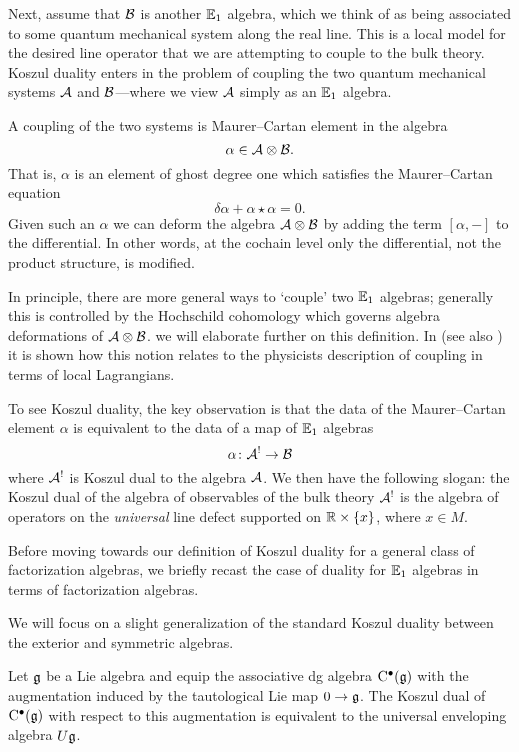 \documentclass[11pt]{amsart}
\begin{document}
Next, assume that $\mathcal B$ is another $\mathbb E_1$ algebra, which we think of as being associated to some quantum mechanical system along the real line.
This is a local model for the desired line operator that we are attempting to couple to the bulk theory.
Koszul duality enters in the problem of coupling the two quantum mechanical systems $\mathcal A$ and $\mathcal B$---where we view $\mathcal A$ simply as an $\mathbb E_1$ algebra. 

A coupling of the two systems is Maurer--Cartan element in the algebra
\[
\alpha \in \mathcal A \otimes \mathcal B .
\]
That is, $\alpha$ is an element of ghost degree one which satisfies the Maurer--Cartan equation
\[
\delta \alpha + \alpha \star \alpha = 0 .
\]
Given such an $\alpha$ we can deform the algebra $\mathcal A \otimes \mathcal B$ by adding the term $[\alpha,-]$ to the differential. 
In other words, at the cochain level only the differential, not the product structure, is modified. 

In principle, there are more general ways to `couple' two $\mathbb E_1$ algebras; generally this is controlled by the Hochschild cohomology which governs algebra deformations of $\mathcal A \otimes \mathcal B$. 
we will elaborate further on this definition. 
In \cite{CG1} (see also \cite{PWkoszul}) it is shown how this notion relates to the physicists description of coupling in terms of local Lagrangians.

To see Koszul duality, the key observation is that the data of the Maurer--Cartan element $\alpha$ is equivalent to the data of a map of $\mathbb E_1$ algebras
\[
\alpha \colon \mathcal A^! \to \mathcal B 
\]
where $\mathcal A^!$ is Koszul dual to the algebra $\mathcal A$. 
We then have the following slogan: the Koszul dual of the algebra of observables of the bulk theory $\mathcal A^!$ is the algebra of operators on the {\em universal} line defect supported on $\mathbb R \times \{x\}$, where $x \in M$.  

\parsec[s:celine]

Before moving towards our definition of Koszul duality for a general class of factorization algebras, we briefly recast the case of duality for $\mathbb E_1$ algebras in terms of factorization algebras. 

We will focus on a slight generalization of the standard Koszul duality between the exterior and symmetric algebras.

\begin{prop}
Let $\mathfrak{g}$ be a Lie algebra and equip the associative dg algebra ${\rm C}^\bullet(\mathfrak g)$ with the augmentation induced by the tautological Lie map $0 \to \mathfrak{g}$.
The Koszul dual of ${\rm C}^\bullet(\mathfrak{g})$ with respect to this augmentation is equivalent to the universal enveloping algebra $U \mathfrak g$. 
\end{prop}
\end{document}
